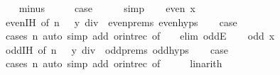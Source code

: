 \begin{isabellebody}
\isamarkupfalse%
\isanewline
\ \ \isamarkupfalse%
\ minus\isanewline
\ \ \isamarkupfalse%
\ \isamarkupfalse%
\ {\isacharquery}{\kern0pt}case\isanewline
\ \ \ \ \isamarkupfalse%
\ simp\isanewline
{}\isamarkupfalse%
\isanewline
\ \ \isamarkupfalse%
\ {\isacharparenleft}{\kern0pt}even\ x{\isacharparenright}{\kern0pt}\isanewline
\ \ \isamarkupfalse%
\ even{\isachardot}{\kern0pt}IH\ {\isacharbrackleft}{\kern0pt}of\ {\isacartoucheopen}n\ {\isacharminus}{\kern0pt}\ {}{\isacartoucheclose}\ {\isacartoucheopen}y\ div\ {}{\isacartoucheclose}{\isacharbrackright}{\kern0pt}\ even{\isachardot}{\kern0pt}prems\ even{\isachardot}{\kern0pt}hyps\isanewline
\ \ \isamarkupfalse%
\ {\isacharquery}{\kern0pt}case\ \isanewline
\ \ \ \ \isamarkupfalse%
\ {\isacharparenleft}{\kern0pt}cases\ n{\isacharparenright}{\kern0pt}\ {\isacharparenleft}{\kern0pt}auto\ simp\ add{\isacharcolon}{\kern0pt}\ or{\isacharunderscore}{\kern0pt}int{\isacharunderscore}{\kern0pt}rec\ {\isacharbrackleft}{\kern0pt}of\ {\isacartoucheopen}{\isacharunderscore}{\kern0pt}\ {\isacharasterisk}{\kern0pt}\ {}{\isacartoucheclose}{\isacharbrackright}{\kern0pt}\ elim{\isacharcolon}{\kern0pt}\ oddE{\isacharparenright}{\kern0pt}\isanewline
{}\isamarkupfalse%
\isanewline
\ \ \isamarkupfalse%
\ {\isacharparenleft}{\kern0pt}odd\ x{\isacharparenright}{\kern0pt}\isanewline
\ \ \isamarkupfalse%
\ odd{\isachardot}{\kern0pt}IH\ {\isacharbrackleft}{\kern0pt}of\ {\isacartoucheopen}n\ {\isacharminus}{\kern0pt}\ {}{\isacartoucheclose}\ {\isacartoucheopen}y\ div\ {}{\isacartoucheclose}{\isacharbrackright}{\kern0pt}\ odd{\isachardot}{\kern0pt}prems\ odd{\isachardot}{\kern0pt}hyps\isanewline
\ \ \isamarkupfalse%
\ {\isacharquery}{\kern0pt}case\isanewline
\ \ \ \ \isamarkupfalse%
\ {\isacharparenleft}{\kern0pt}cases\ n{\isacharparenright}{\kern0pt}\ {\isacharparenleft}{\kern0pt}auto\ simp\ add{\isacharcolon}{\kern0pt}\ or{\isacharunderscore}{\kern0pt}int{\isacharunderscore}{\kern0pt}rec\ {\isacharbrackleft}{\kern0pt}of\ {\isacartoucheopen}{}\ {\isacharplus}{\kern0pt}\ {\isacharunderscore}{\kern0pt}\ {\isacharasterisk}{\kern0pt}\ {}{\isacartoucheclose}{\isacharbrackright}{\kern0pt}{\isacharcomma}{\kern0pt}\ linarith{\isacharparenright}{\kern0pt}\isanewline
{}\isamarkupfalse%
%
\endisatagproof
{\isafoldproof}%

\end{isabellebody}
